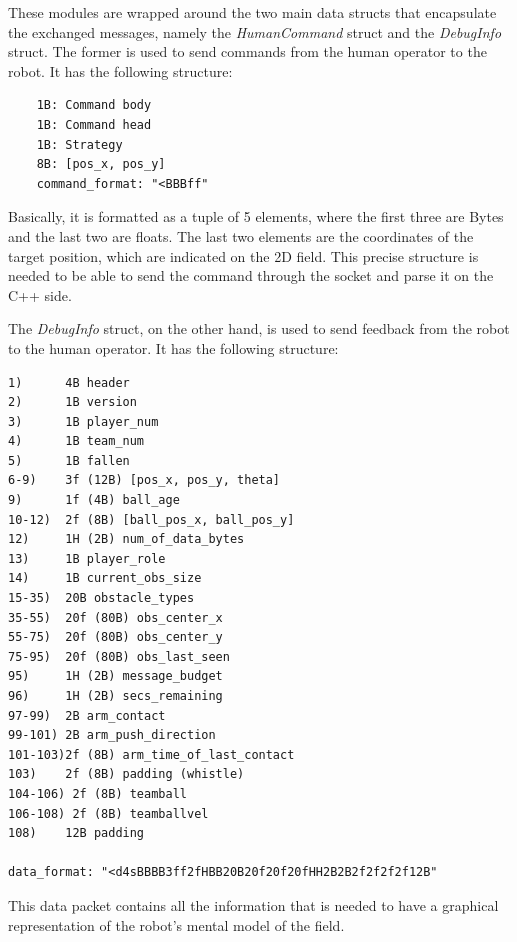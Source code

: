 \documentclass[a4paper, onecolumn, 12pt]{article}
\begin{document}
These modules are wrapped around the two main data structs that encapsulate the
exchanged messages, namely the \textit{HumanCommand} struct and the
\textit{DebugInfo} struct. The former is used to send commands from the human
operator to the robot. It has the following structure:
\begin{verbatim}
    1B: Command body
    1B: Command head
    1B: Strategy
    8B: [pos_x, pos_y]
    command_format: "<BBBff"
\end{verbatim}

Basically, it is formatted as a tuple of 5 elements, where the first three are
Bytes and the last two are floats. The last two elements are the coordinates of
the target position, which are indicated on the 2D field. This precise structure
is needed to be able to send the command through the socket and parse it on the
C++ side.

The \textit{DebugInfo} struct, on the other hand, is used to send feedback from
the robot to the human operator. It has the following structure:

\begin{verbatim}
1)      4B header
2)      1B version
3)      1B player_num
4)      1B team_num
5)      1B fallen
6-9)    3f (12B) [pos_x, pos_y, theta]
9)      1f (4B) ball_age
10-12)  2f (8B) [ball_pos_x, ball_pos_y]
12)     1H (2B) num_of_data_bytes
13)     1B player_role
14)     1B current_obs_size
15-35)  20B obstacle_types  
35-55)  20f (80B) obs_center_x
55-75)  20f (80B) obs_center_y
75-95)  20f (80B) obs_last_seen
95)     1H (2B) message_budget
96)     1H (2B) secs_remaining
97-99)  2B arm_contact
99-101) 2B arm_push_direction
101-103)2f (8B) arm_time_of_last_contact
103)    2f (8B) padding (whistle)
104-106) 2f (8B) teamball
106-108) 2f (8B) teamballvel
108)    12B padding

data_format: "<d4sBBBB3ff2fHBB20B20f20f20fHH2B2B2f2f2f2f12B"
\end{verbatim}

This data packet contains all the information that is needed to have a graphical
representation of the robot's mental model of the field.
\end{document}
